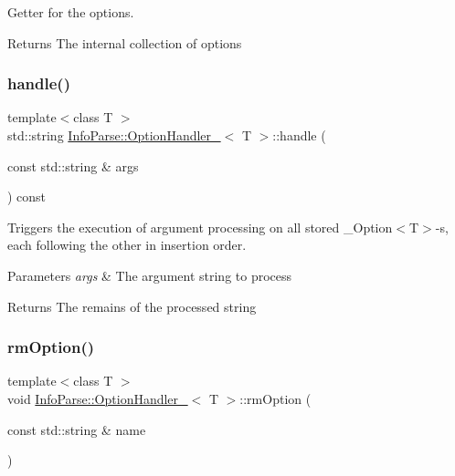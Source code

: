 Getter for the options.

\begin{DoxyReturn}{Returns}
    The internal collection of options
\end{DoxyReturn}
\mbox{\label{class_info_parse_1_1_option_handler___a79febb4c9edeb20e7ea0336265055c82}}
\subsubsection{\texorpdfstring{handle()}{handle()}}
{\footnotesize\ttfamily template$<$class T $>$ \\
std\+::string \mbox{\hyperlink{class_info_parse_1_1_option_handler__}{Info\+Parse\+::\+Option\+Handler\+\_\+}}$<$ T $>$\+::handle (\begin{DoxyParamCaption}
                                                                                                                                       \item[{const std\+::string \&}]{args }
\end{DoxyParamCaption}) const}



Triggers the execution of argument processing on all stored \+\_\+\+Option$<$\+T$>$-\/s, each following the other in insertion order.


\begin{DoxyParams}{Parameters}
{\em args}
    & The argument string to process \\
    \hline
\end{DoxyParams}
\begin{DoxyReturn}{Returns}
    The remains of the processed string
\end{DoxyReturn}
\mbox{\label{class_info_parse_1_1_option_handler___afa03bac484a7cecbd5e868e88e6c56b4}}
\subsubsection{\texorpdfstring{rmOption()}{rmOption()}}
{\footnotesize\ttfamily template$<$class T $>$ \\
void \mbox{\hyperlink{class_info_parse_1_1_option_handler__}{Info\+Parse\+::\+Option\+Handler\+\_\+}}$<$ T $>$\+::rm\+Option (\begin{DoxyParamCaption}
                                                                                                                                  \item[{const std\+::string \&}]{name }
\end{DoxyParamCaption})}



